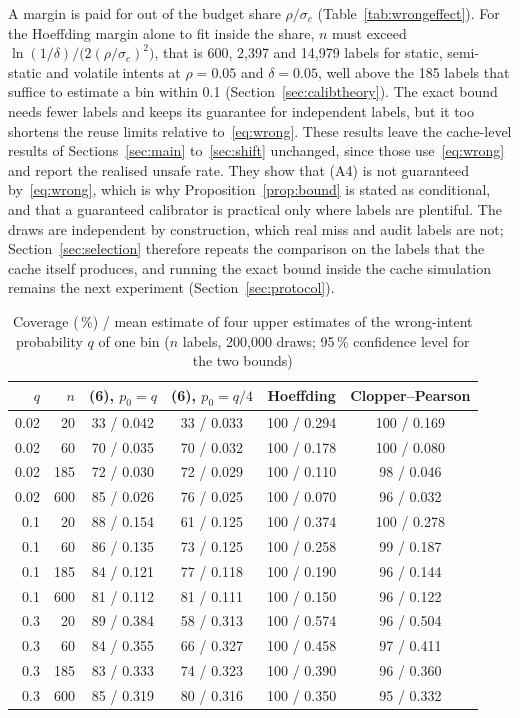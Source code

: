 \documentclass[journal]{IEEEtran}
\newcommand{\pct}{\,\%}
\begin{document}
A margin is paid for out of the budget share $\rho/\sigma_c$ (Table~\ref{tab:wrongeffect}). For the Hoeffding margin alone to fit inside the share, $n$ must exceed $\ln(1/\delta)/\big(2(\rho/\sigma_c)^2\big)$, that is 600, 2,397 and 14,979 labels for static, semi-static and volatile intents at $\rho=0.05$ and $\delta=0.05$, well above the 185 labels that suffice to estimate a bin within 0.1 (Section~\ref{sec:calibtheory}). The exact bound needs fewer labels and keeps its guarantee for independent labels, but it too shortens the reuse limits relative to~\eqref{eq:wrong}. These results leave the cache-level results of Sections~\ref{sec:main} to~\ref{sec:shift} unchanged, since those use~\eqref{eq:wrong} and report the realised unsafe rate. They show that (A4) is not guaranteed by~\eqref{eq:wrong}, which is why Proposition~\ref{prop:bound} is stated as conditional, and that a guaranteed calibrator is practical only where labels are plentiful. The draws are independent by construction, which real miss and audit labels are not; Section~\ref{sec:selection} therefore repeats the comparison on the labels that the cache itself produces, and running the exact bound inside the cache simulation remains the next experiment (Section~\ref{sec:protocol}).

\begin{table}[!t]
\caption{Coverage (\pct{}) / mean estimate of four upper estimates of the wrong-intent probability $q$ of one bin ($n$ labels, 200,000 draws; 95\pct{} confidence level for the two bounds)}
\label{tab:coverage}
\centering\small
\begin{tabular}{rrcccc}
\toprule
$q$ & $n$ & (6), $p_0=q$ & (6), $p_0=q/4$ & Hoeffding & Clopper--Pearson\\
\midrule
0.02 & 20 & 33 / 0.042 & 33 / 0.033 & 100 / 0.294 & 100 / 0.169\\
0.02 & 60 & 70 / 0.035 & 70 / 0.032 & 100 / 0.178 & 100 / 0.080\\
0.02 & 185 & 72 / 0.030 & 72 / 0.029 & 100 / 0.110 & 98 / 0.046\\
0.02 & 600 & 85 / 0.026 & 76 / 0.025 & 100 / 0.070 & 96 / 0.032\\
0.1 & 20 & 88 / 0.154 & 61 / 0.125 & 100 / 0.374 & 100 / 0.278\\
0.1 & 60 & 86 / 0.135 & 73 / 0.125 & 100 / 0.258 & 99 / 0.187\\
0.1 & 185 & 84 / 0.121 & 77 / 0.118 & 100 / 0.190 & 96 / 0.144\\
0.1 & 600 & 81 / 0.112 & 81 / 0.111 & 100 / 0.150 & 96 / 0.122\\
0.3 & 20 & 89 / 0.384 & 58 / 0.313 & 100 / 0.574 & 96 / 0.504\\
0.3 & 60 & 84 / 0.355 & 66 / 0.327 & 100 / 0.458 & 97 / 0.411\\
0.3 & 185 & 83 / 0.333 & 74 / 0.323 & 100 / 0.390 & 96 / 0.360\\
0.3 & 600 & 85 / 0.319 & 80 / 0.316 & 100 / 0.350 & 95 / 0.332\\
\bottomrule
\end{tabular}
\end{table}
\end{document}
